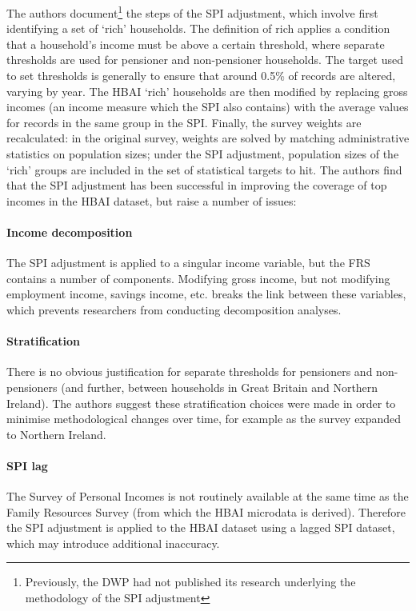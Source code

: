 \documentclass[twocolumn]{article}
\begin{document}
The authors document\footnote{Previously, the DWP had not published its research underlying the methodology of the SPI adjustment} the steps of the SPI adjustment, which involve first identifying a set of `rich' households. The definition of rich applies a condition that a household's income must be above a certain threshold, where separate thresholds are used for pensioner and non-pensioner households. The target used to set thresholds is generally to ensure that around 0.5\% of records are altered, varying by year. The HBAI `rich' households are then modified by replacing gross incomes (an income measure which the SPI also contains) with the average values for records in the same group in the SPI. Finally, the survey weights are recalculated: in the original survey, weights are solved by matching administrative statistics on population sizes; under the SPI adjustment, population sizes of the `rich' groups are included in the set of statistical targets to hit. The authors find that the SPI adjustment has been successful in improving the coverage of top incomes in the HBAI dataset, but raise a number of issues:

\paragraph{Income decomposition} The SPI adjustment is applied to a singular income variable, but the FRS contains a number of components. Modifying gross income, but not modifying employment income, savings income, etc. breaks the link between these variables, which prevents researchers from conducting decomposition analyses.
\paragraph{Stratification} There is no obvious justification for separate thresholds for pensioners and non-pensioners (and further, between households in Great Britain and Northern Ireland). The authors suggest these stratification choices were made in order to minimise methodological changes over time, for example as the survey expanded to Northern Ireland.
\paragraph{SPI lag} The Survey of Personal Incomes is not routinely available at the same time as the Family Resources Survey (from which the HBAI microdata is derived). Therefore the SPI adjustment is applied to the HBAI dataset using a lagged SPI dataset, which may introduce additional inaccuracy.
\end{document}
